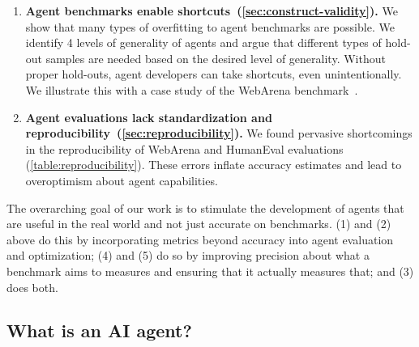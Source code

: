 \documentclass{article}
\begin{document}
\begin{enumerate}[leftmargin=*]
    \item \textbf{Agent benchmarks enable shortcuts~(\cref{sec:construct-validity}).} We show that many types of overfitting to agent benchmarks are possible. We identify 4 levels of generality of agents and argue that different types of hold-out samples are needed based on the desired level of generality. Without proper hold-outs, agent developers can take shortcuts, even unintentionally. We illustrate this with a case study of the WebArena benchmark~\citep{zhou_webarena_2024}. 
    
    \item \textbf{Agent evaluations lack standardization and reproducibility~(\cref{sec:reproducibility}).} We found pervasive shortcomings in the reproducibility of WebArena and HumanEval evaluations (\cref{table:reproducibility}). These errors inflate accuracy estimates and lead to overoptimism about agent capabilities. 

\end{enumerate}



The overarching goal of our work is to stimulate the development of agents that are useful in the real world and not just accurate on benchmarks. (1) and (2) above do this by incorporating metrics beyond accuracy into agent evaluation and optimization; (4) and (5) do so by improving precision about what a benchmark aims to measures and ensuring that it actually measures that; and (3) does both.

\subsection{What is an AI agent?}
\end{document}
